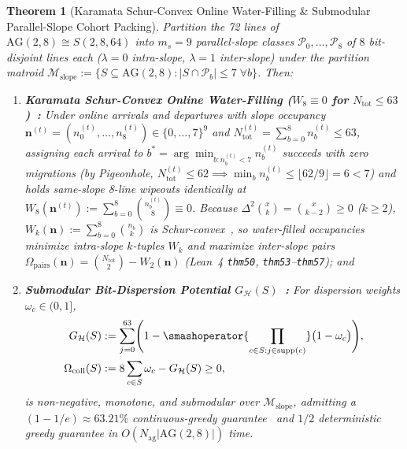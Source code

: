 \documentclass[11pt,letterpaper]{article}
\theoremstyle{spectralthm}
\newtheorem{theorem}{Theorem}[section]
\begin{document}
\begin{theorem}[Karamata Schur-Convex Online Water-Filling \& Submodular Parallel-Slope Cohort Packing]
\label{thm:karamata_waterfilling}
\label{thm:submodular_modcon}
Partition the 72 lines of $\mathrm{AG}(2,8) \cong S(2,8,64)$ into $m_s = 9$ parallel-slope classes $\mathcal{P}_0,\ldots,\mathcal{P}_8$ of $8$ bit-disjoint lines each ($\lambda = 0$ intra-slope, $\lambda = 1$ inter-slope) under the partition matroid $\mathcal{M}_{\mathrm{slope}} := \{S \subseteq \mathrm{AG}(2,8) : |S \cap \mathcal{P}_b| \le 7\;\forall b\}$. Then:
\begin{enumerate}
  \item[(i)] \textbf{Karamata Schur-Convex Online Water-Filling ($W_8 \equiv 0$ for $N_{\mathrm{tot}} \le 63$)~\cite{marshall2011inequalities}:} Under online arrivals and departures with slope occupancy $\mathbf{n}^{(t)} = (n_0^{(t)},\ldots,n_8^{(t)}) \in \{0,\ldots,7\}^9$ and $N_{\mathrm{tot}}^{(t)} = \sum_{b=0}^8 n_b^{(t)} \le 63$, assigning each arrival to $b^* = \arg\min_{b : n_b^{(t)} < 7} n_b^{(t)}$ succeeds with zero migrations (by Pigeonhole, $N_{\mathrm{tot}}^{(t)} \le 62 \implies \min_b n_b^{(t)} \le \lfloor 62/9 \rfloor = 6 < 7$) and holds same-slope 8-line wipeouts identically at $W_8(\mathbf{n}^{(t)}) := \sum_{b=0}^8 \binom{n_b^{(t)}}{8} \equiv 0$. Because $\Delta^2 \binom{x}{k} = \binom{x}{k-2} \ge 0$ ($k \ge 2$), $W_k(\mathbf{n}) := \sum_{b=0}^8 \binom{n_b}{k}$ is Schur-convex~\cite{marshall2011inequalities}, so water-filled occupancies minimize intra-slope $k$-tuples $W_k$ and maximize inter-slope pairs $\Omega_{\mathrm{pairs}}(\mathbf{n}) = \binom{N_{\mathrm{tot}}}{2} - W_2(\mathbf{n})$ (Lean~4 \texttt{thm50}, \texttt{thm53}--\texttt{thm57}); and
  \item[(ii)] \textbf{Submodular Bit-Dispersion Potential $G_{\mathcal{H}}(S)$~\cite{calinescu2011maximizing}:} For dispersion weights $\omega_c \in (0,1]$,
  \begin{equation}
  \label{eq:submodular_dispersion}
  \begin{aligned}
  G_{\mathcal{H}}(S) &:= \sum_{j=0}^{63} \Biggl(1 - \smashoperator{\prod_{c \in S : j \in \mathrm{supp}(c)}} \bigl(1 - \omega_c\bigr)\Biggr),\\
  \Omega_{\mathrm{coll}}(S) &:= 8 \sum_{c \in S} \omega_c - G_{\mathcal{H}}(S) \ge 0,
  \end{aligned}
  \end{equation}
  is non-negative, monotone, and submodular over $\mathcal{M}_{\mathrm{slope}}$, admitting a $(1 - 1/e) \approx 63.21\%$ continuous-greedy guarantee~\cite{calinescu2011maximizing} and $1/2$ deterministic greedy guarantee in $O(N_{\mathrm{ag}} |\mathrm{AG}(2,8)|)$ time.
\end{enumerate}
\end{theorem}
\end{document}
